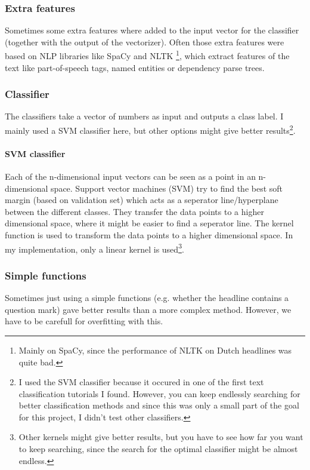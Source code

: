 \documentclass{article}
\begin{document}
\subsubsection{Extra features}
Sometimes some extra features where added to the input vector for the classifier (together with the output of the vectorizer). Often those extra features were based on NLP libraries like SpaCy and NLTK \footnote{Mainly on SpaCy, since the performance of NLTK on Dutch headlines was quite bad.}, which extract features of the text like part-of-speech tags, named entities or dependency parse trees. \cite{vasiliev2020natural}

\subsubsection{Classifier}
The classifiers take a vector of numbers as input and outputs a class label. I mainly used a SVM classifier here, but other options might give better results\footnote{I used the SVM classifier because it occured in one of the first text classification tutorials I found. However, you can keep endlessly searching for better classification methods and since this was only a small part of the goal for this project, I didn't test other classifiers.}. %

\paragraph{SVM classifier}
 Each of the n-dimensional input vectors can be seen as a point in an n-dimensional space. Support vector machines (SVM) try to find the best soft margin (based on validation set) which acts as a seperator line/hyperplane between the different classes. They transfer the data points to a higher dimensional space, where it might be easier to find a seperator line. The kernel function is used to transform the data points to a higher dimensional space. In my implementation, only a linear kernel is used\footnote{Other kernels might give better results, but you have to see how far you want to keep searching, since the search for the optimal classifier might be almost endless.}. \cite{gholami2017support}

\subsubsection{Simple functions}
Sometimes just using a simple functions (e.g. whether the headline contains a question mark) gave better results than a more complex method. However, we have to be carefull for overfitting with this.
\end{document}
